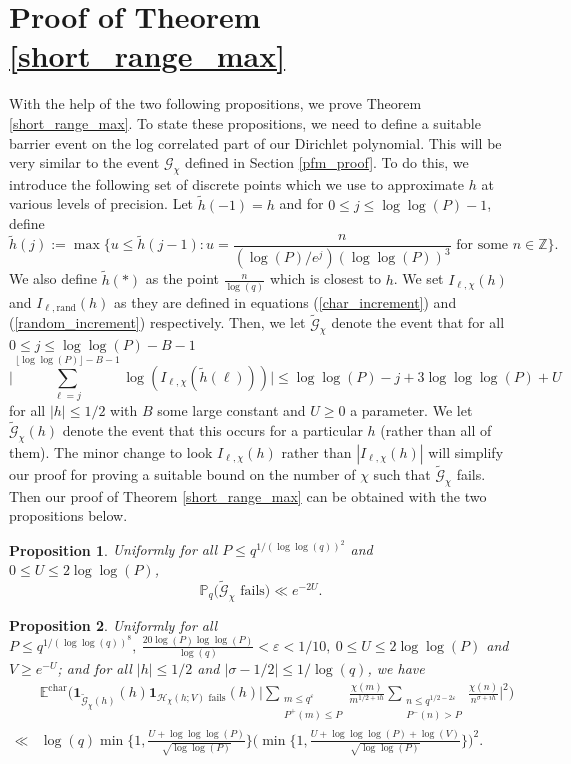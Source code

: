 \documentclass[reqno]{amsart}
\newtheorem{proposition}{Proposition}[section]
\theoremstyle{definition}
\theoremstyle{remark}
\numberwithin{equation}{section}
\theoremstyle{remark}
\begin{document}
\section{Proof of Theorem \ref{short_range_max}} \label{typical_max_section}
With the help of the two following propositions, we prove Theorem \ref{short_range_max}. To state these propositions, we need to define a suitable barrier event on the log correlated part of our Dirichlet polynomial. This will be very similar to the event $\mathcal{G}_\chi$ defined in Section \ref{pfm_proof}. To do this, we introduce the following set of discrete points which we use to approximate $h$ at various levels of precision. Let $\tilde{h}(-1) =h$ and for $0 \leq j \leq \log\log(P)-1$, define
$$\tilde{h}(j) := \max\big\{u \leq \tilde{h}(j-1):u=\frac{n}{(\log(P)/e^j)(\log\log(P))^3} \text{ for some } n \in \mathbb{Z}\big\}.$$
We also define $\tilde{h}(*)$ as the point $\frac{n}{\log(q)}$ which is closest to $h$. We set $I_{\ell,\chi}(h)$ and $I_{\ell,\text{rand}}(h)$ as they are defined in equations (\ref{char_increment}) and (\ref{random_increment}) respectively. Then, we let $\widetilde{\mathcal{G}}_\chi$ denote the event that for all $0 \leq j \leq \log\log(P)-B-1$
$$\big|\sum_{\ell =j}^{\lfloor\log\log(P)\rfloor-B-1}\log(I_{\ell,\chi}(\tilde{h}(\ell)))\big| \leq \log\log(P)-j+3\log\log\log(P) +U$$
for all $|h| \leq 1/2$ with $B$ some large constant and $U\geq 0$ a parameter. We let $\widetilde{\mathcal{G}}_\chi(h)$ denote the event that this occurs for a particular $h$ (rather than all of them). The minor change to look $I_{\ell,\chi}(h)$ rather than $|I_{\ell,\chi}(h)|$ will simplify our proof for proving a suitable bound on the number of $\chi$ such that $\widetilde{\mathcal{G}}_\chi$ fails. Then our proof of Theorem \ref{short_range_max} can be obtained with the two propositions below.
\begin{proposition}
    Uniformly for all $P \leq q^{1/(\log\log(q))^2}$ and $0 \leq U \leq 2\log\log(P)$,
    $$\mathbb{P}_q\big(\widetilde{\mathcal{G}}_\chi \text{ fails}\big) \ll e^{-2U}.$$ \label{max_event_fail}
\end{proposition}
\begin{proposition}
    Uniformly for all $P \leq q^{1/(\log\log(q))^8}, \ \frac{20\log(P)\log\log(P)}{\log(q)}< \varepsilon < 1/10, \ 0 \leq U \leq 2\log\log(P)$ and $V \geq e^{-U}$; and for all $|h| \leq 1/2$ and $|\sigma-1/2| \leq 1/\log(q)$, we have
    \begin{align*}
        &\mathbb{E}^{\text{char}}\big(\mathbf{1}_{\widetilde{\mathcal{G}}_\chi(h)}(h)\mathbf{1}_{\mathcal{H}_\chi(h;V) \text{ fails}}(h)\big|\sum_{\substack{m \leq q^\varepsilon \\ P^+(m) \leq P}}\frac{\chi(m)}{m^{1/2+ih}}\sum_{\substack{n \leq q^{1/2-2\varepsilon} \\ P^-(n) > P}}\frac{\chi(n)}{n^{\sigma+ih}}\big|^2\big) \\
        \ll& \log(q)\min\big\{1,\frac{U+\log\log\log(P)}{\sqrt{\log\log(P)}}\big\}\big(\min\big\{1,\frac{U+\log\log\log(P)+\log(V)}{\sqrt{\log\log(P)}}\big\}\big)^2. 
    \end{align*} \label{conditional_bound_max}
\end{proposition}
\end{document}
